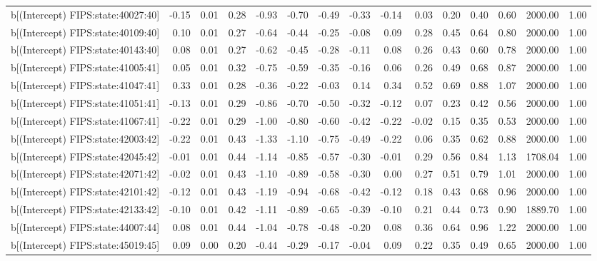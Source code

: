 \begin{table}[ht]
\begin{tabular}{rrrrrrrrrrrrrrr}
  b[(Intercept) FIPS:state:40027:40] & -0.15 & 0.01 & 0.28 & -0.93 & -0.70 & -0.49 & -0.33 & -0.14 & 0.03 & 0.20 & 0.40 & 0.60 & 2000.00 & 1.00 \\ 
  b[(Intercept) FIPS:state:40109:40] & 0.10 & 0.01 & 0.27 & -0.64 & -0.44 & -0.25 & -0.08 & 0.09 & 0.28 & 0.45 & 0.64 & 0.80 & 2000.00 & 1.00 \\ 
  b[(Intercept) FIPS:state:40143:40] & 0.08 & 0.01 & 0.27 & -0.62 & -0.45 & -0.28 & -0.11 & 0.08 & 0.26 & 0.43 & 0.60 & 0.78 & 2000.00 & 1.00 \\ 
  b[(Intercept) FIPS:state:41005:41] & 0.05 & 0.01 & 0.32 & -0.75 & -0.59 & -0.35 & -0.16 & 0.06 & 0.26 & 0.49 & 0.68 & 0.87 & 2000.00 & 1.00 \\ 
  b[(Intercept) FIPS:state:41047:41] & 0.33 & 0.01 & 0.28 & -0.36 & -0.22 & -0.03 & 0.14 & 0.34 & 0.52 & 0.69 & 0.88 & 1.07 & 2000.00 & 1.00 \\ 
  b[(Intercept) FIPS:state:41051:41] & -0.13 & 0.01 & 0.29 & -0.86 & -0.70 & -0.50 & -0.32 & -0.12 & 0.07 & 0.23 & 0.42 & 0.56 & 2000.00 & 1.00 \\ 
  b[(Intercept) FIPS:state:41067:41] & -0.22 & 0.01 & 0.29 & -1.00 & -0.80 & -0.60 & -0.42 & -0.22 & -0.02 & 0.15 & 0.35 & 0.53 & 2000.00 & 1.00 \\ 
  b[(Intercept) FIPS:state:42003:42] & -0.22 & 0.01 & 0.43 & -1.33 & -1.10 & -0.75 & -0.49 & -0.22 & 0.06 & 0.35 & 0.62 & 0.88 & 2000.00 & 1.00 \\ 
  b[(Intercept) FIPS:state:42045:42] & -0.01 & 0.01 & 0.44 & -1.14 & -0.85 & -0.57 & -0.30 & -0.01 & 0.29 & 0.56 & 0.84 & 1.13 & 1708.04 & 1.00 \\ 
  b[(Intercept) FIPS:state:42071:42] & -0.02 & 0.01 & 0.43 & -1.10 & -0.89 & -0.58 & -0.30 & 0.00 & 0.27 & 0.51 & 0.79 & 1.01 & 2000.00 & 1.00 \\ 
  b[(Intercept) FIPS:state:42101:42] & -0.12 & 0.01 & 0.43 & -1.19 & -0.94 & -0.68 & -0.42 & -0.12 & 0.18 & 0.43 & 0.68 & 0.96 & 2000.00 & 1.00 \\ 
  b[(Intercept) FIPS:state:42133:42] & -0.10 & 0.01 & 0.42 & -1.11 & -0.89 & -0.65 & -0.39 & -0.10 & 0.21 & 0.44 & 0.73 & 0.90 & 1889.70 & 1.00 \\ 
  b[(Intercept) FIPS:state:44007:44] & 0.08 & 0.01 & 0.44 & -1.04 & -0.78 & -0.48 & -0.20 & 0.08 & 0.36 & 0.64 & 0.96 & 1.22 & 2000.00 & 1.00 \\ 
  b[(Intercept) FIPS:state:45019:45] & 0.09 & 0.00 & 0.20 & -0.44 & -0.29 & -0.17 & -0.04 & 0.09 & 0.22 & 0.35 & 0.49 & 0.65 & 2000.00 & 1.00 \\ 

\end{tabular}
\end{table}
